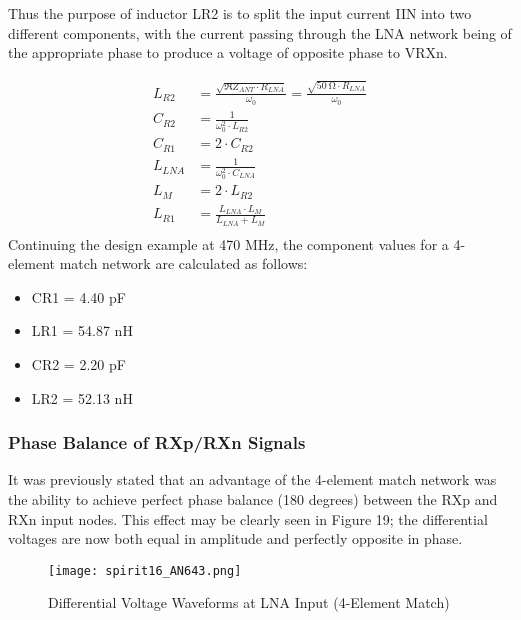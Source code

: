         Thus the purpose of inductor LR2 is to split the input current IIN into two different 
        components, with the current passing through the LNA network being of the appropriate phase 
        to produce a voltage of opposite phase to VRXn.
        
        \begin{align}
          L_{R2}  &= \frac{\sqrt{\Re{Z_{ANT}}\cdot R_{LNA}}}{\omega_0} 
                   = \frac{\sqrt{\qty{50}{\ohm}\cdot R_{LNA}}}{\omega_0} 
                   \label{EXP001:eq_spirit20}   \\ 
          C_{R2}  &= \frac{1}{\omega_0^2\cdot L_{R2}}          \label{EXP001:eq_spirit21}   \\ 
          C_{R1}  &= 2\cdot C_{R2}                             \label{EXP001:eq_spirit22}   \\ 
          L_{LNA} &= \frac{1}{\omega_0^2\cdot C_{LNA}}         \label{EXP001:eq_spirit23}   \\ 
          L_{M}   &= 2\cdot L_{R2}                             \label{EXP001:eq_spirit24}   \\ 
          L_{R1}  &= \frac{L_{LNA}\cdot L_M}{L_{LNA} + L_M}    \label{EXP001:eq_spirit25}   \\ 
        \end{align}
        Continuing the design example at 470 MHz, the component values for a 4-element match 
        network are calculated as follows:
        \begin{itemize}[noitemsep]
          \item CR1 = 4.40 pF
          \item LR1 = 54.87 nH
          \item CR2 = 2.20 pF
          \item LR2 = 52.13 nH          
        \end{itemize}
        
      \subsubsection{Phase Balance of RXp/RXn Signals}
        It was previously stated that an advantage of the 4-element match network was the ability 
        to achieve perfect phase balance (180 degrees) between the RXp and RXn input nodes. This 
        effect may be clearly seen in Figure 19; the differential voltages are now both equal in 
        amplitude and perfectly opposite in phase.
        
        \begin{figure}[ht!] %
          \centering
          \texttt{[image: spirit16\_AN643.png]}
          \caption{Differential Voltage Waveforms at LNA Input (4-Element Match) 
                   \cite[s.~16]{AN643SiliconLabs}}
          \label{EXP001:fig_spirit16}
        \end{figure}
        
